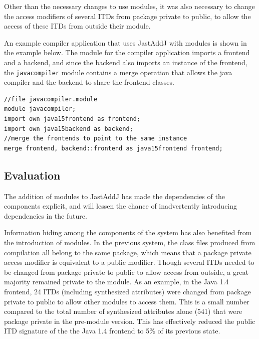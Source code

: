 Other than the necessary changes to use modules, it was also necessary to change the 
access modifiers of several ITDs from package private to public, to allow the 
access of these ITDs from outside their module. 

An example compiler application that uses JastAddJ with modules is shown in the example below.
The module for the compiler application imports a frontend and a backend, and since the backend 
also imports an instance of the frontend, the \texttt{javacompiler} module contains a merge
operation that allows the java compiler and the backend to share the frontend classes.

\begin{lstlisting}[caption={JastAddJ Compiler Application}]
//file javacompiler.module
module javacompiler;
import own java15frontend as frontend;
import own java15backend as backend;
//merge the frontends to point to the same instance
merge frontend, backend::frontend as java15frontend frontend;
\end{lstlisting}

\subsection{Evaluation}

The addition of modules to JastAddJ has made the dependencies of the components
explicit, and will lessen the chance of inadvertently introducing dependencies 
in the future. 

Information hiding among the components of the system has also benefited from
the introduction of modules. In the previous system, the class files produced from
compilation all belong to the same package, which means that a package private access modifier
is equivalent to a public modifier. Though several ITDs needed to be changed from 
package private to public to allow access from outside, a great majority remained private to
the module. As an example, in the Java 1.4 frontend, 24 ITDs (including synthesized attributes)
were changed from package private to public to allow other modules to access them. This is a small number 
compared to the total number of synthesized attributes alone (541) that were package private in the pre-module version.
This has effectively reduced the public ITD signature of the the Java 1.4 frontend to 5\% of its previous state.

